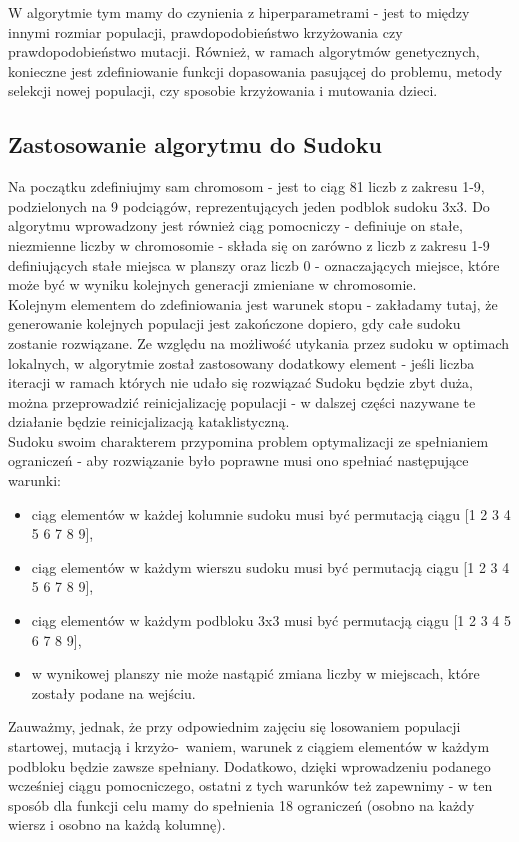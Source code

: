 \documentclass[11pt]{scrartcl} %
\begin{document}
W algorytmie tym mamy do czynienia z hiperparametrami - jest to między innymi rozmiar populacji, prawdopodobieństwo krzyżowania czy prawdopodobieństwo mutacji. Również, w ramach algorytmów genetycznych, konieczne jest zdefiniowanie funkcji dopasowania pasującej do problemu, metody selekcji nowej populacji, czy sposobie krzyżowania i mutowania dzieci.

\subsection{Zastosowanie algorytmu do Sudoku}

Na początku zdefiniujmy sam chromosom - jest to ciąg 81 liczb z zakresu 1-9, podzielonych na 9 podciągów, reprezentujących jeden podblok sudoku 3x3. Do algorytmu wprowadzony jest również ciąg pomocniczy - definiuje on stałe, niezmienne liczby w chromosomie - składa się on zarówno z liczb z zakresu 1-9 definiujących stałe miejsca w planszy oraz liczb 0 - oznaczających miejsce, które może być w wyniku kolejnych generacji zmieniane w chromosomie.\\

Kolejnym elementem do zdefiniowania jest warunek stopu - zakładamy tutaj, że generowanie kolejnych populacji jest zakończone dopiero, gdy całe sudoku zostanie rozwiązane. Ze względu na możliwość utykania przez sudoku w optimach lokalnych, w algorytmie został zastosowany dodatkowy element - jeśli liczba iteracji w ramach których nie udało się rozwiązać Sudoku będzie zbyt duża, można przeprowadzić reinicjalizację populacji - w dalszej części nazywane te działanie będzie reinicjalizacją kataklistyczną.\\

Sudoku swoim charakterem przypomina problem optymalizacji ze spełnianiem ograniczeń - aby rozwiązanie było poprawne musi ono spełniać następujące warunki:
\begin{itemize}
  \item ciąg elementów w każdej kolumnie sudoku musi być permutacją ciągu [1 2 3 4 5 6 7 8 9],
  \item ciąg elementów w każdym wierszu sudoku musi być permutacją ciągu [1 2 3 4 5 6 7 8 9],
  \item ciąg elementów w każdym podbloku 3x3 musi być permutacją ciągu [1 2 3 4 5 6 7 8 9],
  \item w wynikowej planszy nie może nastąpić zmiana liczby w miejscach, które zostały podane na wejściu.
\end{itemize}
Zauważmy, jednak, że przy odpowiednim zajęciu się losowaniem populacji startowej, mutacją i krzyżo-\ waniem, warunek z ciągiem elementów w każdym podbloku będzie zawsze spełniany. Dodatkowo, dzięki wprowadzeniu podanego wcześniej ciągu pomocniczego, ostatni z tych warunków też zapewnimy - w ten sposób dla funkcji celu mamy do spełnienia 18 ograniczeń (osobno na każdy wiersz i osobno na każdą kolumnę).\\
\end{document}
